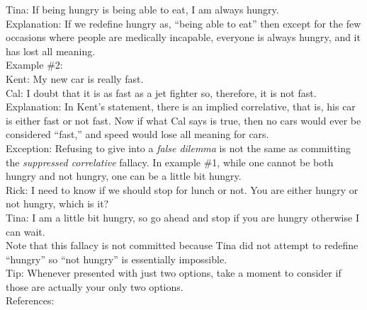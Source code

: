 \documentclass[a4paper,12pt,single,pdftex]{scrbook}
\begin{document}
    
      Tina: If being hungry is being able to eat, I am always hungry.
    \\

    
      Explanation: If we redefine hungry as, “being able to eat” then except for the few occasions where people are medically incapable, everyone is always hungry, and it has lost all meaning.
    \\

    
      Example \#2:
    \\

    
      Kent: My new car is really fast.
    \\

    
      Cal: I doubt that it is as fast as a jet fighter so, therefore, it is not fast.
    \\

    
      Explanation: In Kent’s statement, there is an implied correlative, that is, his car is either fast or not fast.  Now if what Cal says is true, then no cars would ever be considered “fast,” and speed would lose all meaning for cars.
    \\

    
      Exception: Refusing to give into a {\it false dilemma} is not the same as committing the {\it suppressed correlative} fallacy.  In example \#1, while one cannot be both hungry and not hungry, one can be a little bit hungry.
    \\

    
      Rick: I need to know if we should stop for lunch or not.  You are either hungry or not hungry, which is it?
    \\

    
      Tina: I am a little bit hungry, so go ahead and stop if you are hungry otherwise I can wait.
    \\

    
      Note that this fallacy is not committed because Tina did not attempt to redefine “hungry” so “not hungry” is essentially impossible.
    \\

    
      Tip: Whenever presented with just two options, take a moment to consider if those are actually your only two options.
    \\

    References:

    
      
        
      \\

      
        
\end{document}
